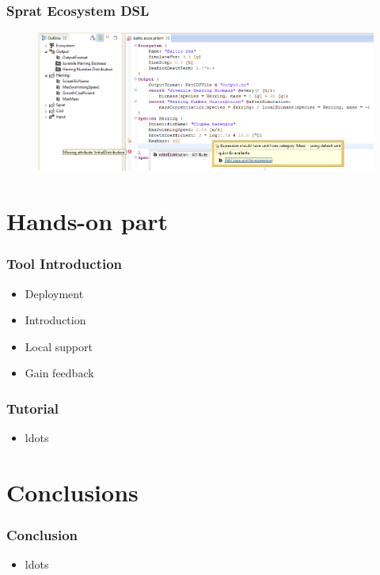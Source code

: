 \begin{frame}[fragile]
\frametitle{Sprat Ecosystem DSL}
\begin{figure}
\includegraphics[width=1.1\textwidth]{images/ecosystem-dsl}
\end{figure}
\end{frame}


\section{Hands-on part}

\begin{frame}[fragile]
\frametitle{Tool Introduction}
\begin{itemize}
\item Deployment
\item Introduction
\item Local support
\item Gain feedback
\end{itemize}
\end{frame}

\begin{frame}[fragile]
\frametitle{Tutorial}
\begin{itemize}
\item ldots
\end{itemize}
\end{frame}

\section{Conclusions}

\begin{frame}[fragile]
\frametitle{Conclusion}
\begin{itemize}
\item ldots
\end{itemize}
\end{frame}

